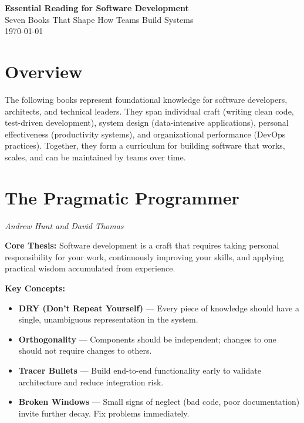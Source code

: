 \documentclass[11pt, letterpaper]{article}
\begin{document}
\begin{center}
{\Large \textbf{Essential Reading for Software Development}}\\[0.5em]
{\color{accent}\small Seven Books That Shape How Teams Build Systems}\\[0.3em]
{\small \today}
\end{center}

\vspace{1.5em}

\section*{Overview}

The following books represent foundational knowledge for software developers, architects, and technical leaders. They span individual craft (writing clean code, test-driven development), system design (data-intensive applications), personal effectiveness (productivity systems), and organizational performance (DevOps practices). Together, they form a curriculum for building software that works, scales, and can be maintained by teams over time.

\vspace{1em}

\section*{The Pragmatic Programmer}
\textit{Andrew Hunt and David Thomas}

\textbf{Core Thesis:} Software development is a craft that requires taking personal responsibility for your work, continuously improving your skills, and applying practical wisdom accumulated from experience.

\textbf{Key Concepts:}
\begin{itemize}
    \item \textbf{DRY (Don't Repeat Yourself)} --- Every piece of knowledge should have a single, unambiguous representation in the system.
    \item \textbf{Orthogonality} --- Components should be independent; changes to one should not require changes to others.
    \item \textbf{Tracer Bullets} --- Build end-to-end functionality early to validate architecture and reduce integration risk.
    \item \textbf{Broken Windows} --- Small signs of neglect (bad code, poor documentation) invite further decay. Fix problems immediately.
\end{itemize}
\end{document}
